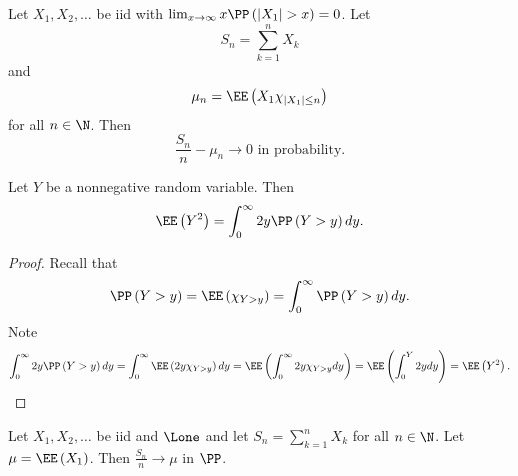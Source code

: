 \documentclass[stat901]{subfiles}
\begin{document}
    \rruleline
    
    \begin{theorem}{}
        Let $X_1,X_2,\ldots$ be iid with $\lim_{x\to\infty}x\PP\left( \left| X_1 \right|>x \right) = 0$. Let
        \begin{equation*}
            S_n = \sum^{n}_{k=1} X_k
        \end{equation*}
        and
        \begin{equation*}
            \mu_n = \EE\left( X_1\chi_{\left| X_1 \right|\leq n} \right)
        \end{equation*}
        for all $n\in\N$. Then
        \begin{equation*}
            \frac{S_n}{n}-\mu_n\to 0 \text{ in probability}.
        \end{equation*}
    \end{theorem}

    \rruleline
    
    \begin{lemma}{}
        Let $Y$ be a nonnegative random variable. Then
        \begin{equation*}
            \EE\left( Y^{2} \right) = \int^{\infty}_{0} 2y\PP\left( Y>y \right)dy.
        \end{equation*}
    \end{lemma}

    \begin{proof}
        Recall that
        \begin{equation*}
            \PP\left( Y>y \right) = \EE\left( \chi_{Y>y} \right) = \int^{\infty}_{0}\PP\left( Y>y \right)dy.
        \end{equation*}
        Note
        \begin{equation*}
            \int^{\infty}_{0} 2y\PP\left( Y>y \right)dy = \int^{\infty}_{0} \EE\left( 2y\chi_{Y>y} \right)dy = \EE\left( \int^{\infty}_{0} 2y\chi_{Y>y}dy \right) = \EE\left( \int^{Y}_{0} 2ydy \right) = \EE\left( Y^{2} \right).
        \end{equation*}
    \end{proof}
    
    \begin{theorem}{}
        Let $X_1,X_2,\ldots$ be iid and $\Lone$ and let $S_n = \sum^{n}_{k=1} X_k$ for all $n\in\N$. Let $\mu=\EE\left( X_1 \right)$. Then $\frac{S_n}{n}\to \mu$ in $\PP$.
    \end{theorem}

    \rruleline

    \clearpage
\end{document}
